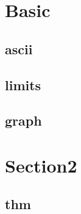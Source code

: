 \section{Basic}
    \subsection{ascii}
        
    \subsection{limits}
            
    \subsection{graph}
        
        
\section{Section2}
    \subsection{thm}
        